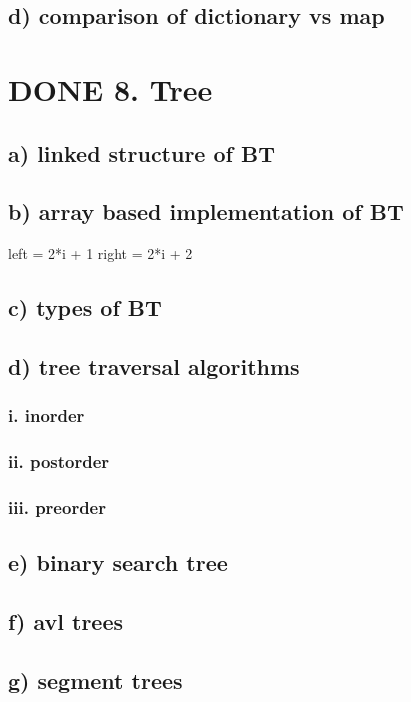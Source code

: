 \documentclass[11pt]{article}
\begin{document}
\subsection{d) comparison of dictionary vs map}
\label{sec:org8eed953}
\section{{\bfseries\sffamily DONE} 8. Tree}
\label{sec:org7a3c11e}
\subsection{a) linked structure of BT}
\label{sec:org2290981}
\subsection{b) array based implementation of BT}
\label{sec:org5c02922}
left = 2*i + 1
right = 2*i + 2
\subsection{c) types of BT}
\label{sec:org80052b9}
\subsection{d) tree traversal algorithms}
\label{sec:org94458cd}
\subsubsection{i. inorder}
\label{sec:orgcaa021f}
\subsubsection{ii. postorder}
\label{sec:org6b0a594}
\subsubsection{iii. preorder}
\label{sec:orgc25f1f8}
\subsection{e) binary search tree}
\label{sec:org68f6937}
\subsection{f) avl trees}
\label{sec:org7cd5299}
\subsection{g) segment trees}
\label{sec:orgfd2998e}
\end{document}
